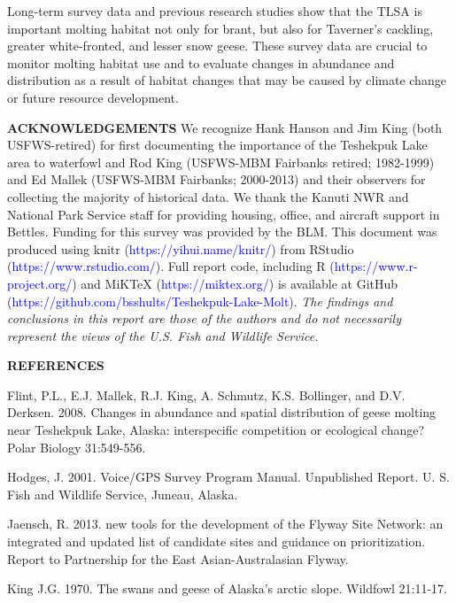 \documentclass[]{article}
\begin{document}
Long-term survey data and previous research studies show that the TLSA
is important molting habitat not only for brant, but also for Taverner's
cackling, greater white-fronted, and lesser snow geese. These survey
data are crucial to monitor molting habitat use and to evaluate changes
in abundance and distribution as a result of habitat changes that may be
caused by climate change or future resource development.

\textbf{ACKNOWLEDGEMENTS}\newline
We recognize Hank Hanson and Jim King (both USFWS-retired) for first
documenting the importance of the Teshekpuk Lake area to waterfowl and
Rod King (USFWS-MBM Fairbanks retired; 1982-1999) and Ed Mallek
(USFWS-MBM Fairbanks; 2000-2013) and their observers for collecting the
majority of historical data. We thank the Kanuti NWR and National Park
Service staff for providing housing, office, and aircraft support in
Bettles. Funding for this survey was provided by the BLM. This document
was produced using knitr (\textcolor{blue}{https://yihui.name/knitr/})
from RStudio (\textcolor{blue}{https://www.rstudio.com/}). Full report
code, including R (\textcolor{blue}{https://www.r-project.org/}) and
MiKTeX (\textcolor{blue}{https://miktex.org/}) is available at GitHub
(\textcolor{blue}{https://github.com/bsshults/Teshekpuk-Lake-Molt}).
\newline
\textit{\small{The findings and conclusions in this report are those of the authors and do not necessarily represent the views of the U.S. Fish and Wildlife Service.}}

\textbf{REFERENCES}

\setlength{\parindent}{-0.2in} \setlength{\leftskip}{0.2in}
\setlength{\parskip}{1ex}

Flint, P.L., E.J. Mallek, R.J. King, A. Schmutz, K.S. Bollinger, and
D.V. Derksen. 2008. Changes in abundance and spatial distribution of
geese molting near Teshekpuk Lake, Alaska: interspecific competition or
ecological change? Polar Biology 31:549-556.

Hodges, J. 2001. Voice/GPS Survey Program Manual. Unpublished Report. U.
S. Fish and Wildlife Service, Juneau, Alaska.

Jaensch, R. 2013. new tools for the development of the Flyway Site
Network: an integrated and updated list of candidate sites and guidance
on prioritization. Report to Partnership for the East Asian-Australasian
Flyway.

King J.G. 1970. The swans and geese of Alaska's arctic slope. Wildfowl
21:11-17.
\end{document}
